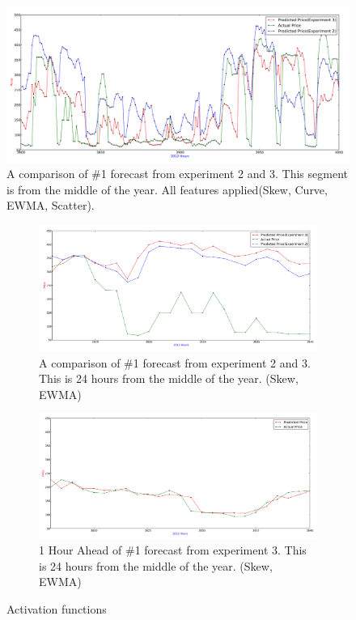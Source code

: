 \begin{figure}[H]
\centering
\includegraphics[width=\linewidth,natwidth=898,natheight=587]{billeder/PriceExperimentalAnalysis/X2_X3_AllFeatures_3800_4000.png}
\caption{A comparison of \#1 forecast from experiment 2 and 3. This segment is from the middle of the year. All features applied(Skew, Curve, EWMA, Scatter).}
\label{fig:X2_X3_AllParameters_3800_4000}
\end{figure}

\begin{figure}[H]
\centering
\begin{subfigure}{.5\textwidth}
  \centering
	\includegraphics[width=\linewidth,natwidth=898,natheight=587]{billeder/PriceExperimentalAnalysis/X2_X3_3816_3840.png}
	\caption{A comparison of \#1 forecast from experiment 2 and 3. This is 24 hours from the middle of the year. (Skew, EWMA)}
	\label{fig:X2_X3_3816_3840}
\end{subfigure}%
\begin{subfigure}{.5\textwidth}
  \centering
	\includegraphics[width=\linewidth,natwidth=898,natheight=587]{billeder/PriceExperimentalAnalysis/X2_X3_3816_3840_1hourAhead.png}
	\caption{1 Hour Ahead of \#1 forecast from experiment 3. This is 24 hours from the middle of the year. (Skew, EWMA)}
	\label{fig:X2_X3_3816_3840_1hourahead}
\end{subfigure}
\caption{Activation functions}
\label{fig:1hourAhead}
\end{figure}

